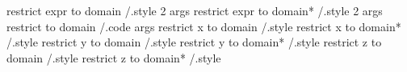 restrict expr to domain  /.style 2 args
restrict expr to domain* /.style 2 args
restrict to domain       /.code args
restrict x to domain     /.style
restrict x to domain*    /.style
restrict y to domain     /.style
restrict y to domain*    /.style
restrict z to domain     /.style
restrict z to domain*    /.style

